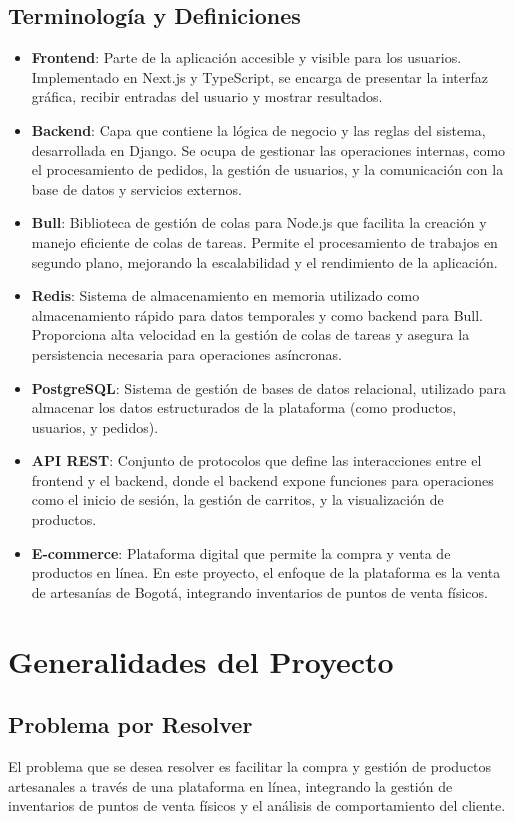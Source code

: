\documentclass[12pt]{article}
\begin{document}
\subsection{Terminología y Definiciones}
\begin{itemize}
    \item \textbf{Frontend}: Parte de la aplicación accesible y visible para los usuarios. Implementado en Next.js y TypeScript, se encarga de presentar la interfaz gráfica, recibir entradas del usuario y mostrar resultados.
    \item \textbf{Backend}: Capa que contiene la lógica de negocio y las reglas del sistema, desarrollada en Django. Se ocupa de gestionar las operaciones internas, como el procesamiento de pedidos, la gestión de usuarios, y la comunicación con la base de datos y servicios externos.
    \item \textbf{Bull}: Biblioteca de gestión de colas para Node.js que facilita la creación y manejo eficiente de colas de tareas. Permite el procesamiento de trabajos en segundo plano, mejorando la escalabilidad y el rendimiento de la aplicación.
    \item \textbf{Redis}: Sistema de almacenamiento en memoria utilizado como almacenamiento rápido para datos temporales y como backend para Bull. Proporciona alta velocidad en la gestión de colas de tareas y asegura la persistencia necesaria para operaciones asíncronas.
    \item \textbf{PostgreSQL}: Sistema de gestión de bases de datos relacional, utilizado para almacenar los datos estructurados de la plataforma (como productos, usuarios, y pedidos).
    \item \textbf{API REST}: Conjunto de protocolos que define las interacciones entre el frontend y el backend, donde el backend expone funciones para operaciones como el inicio de sesión, la gestión de carritos, y la visualización de productos.
    \item \textbf{E-commerce}: Plataforma digital que permite la compra y venta de productos en línea. En este proyecto, el enfoque de la plataforma es la venta de artesanías de Bogotá, integrando inventarios de puntos de venta físicos.
\end{itemize}

\section{Generalidades del Proyecto}

\subsection{Problema por Resolver}
El problema que se desea resolver es facilitar la compra y gestión de productos artesanales a través de una plataforma en línea, integrando la gestión de inventarios de puntos de venta físicos y el análisis de comportamiento del cliente.
\end{document}
